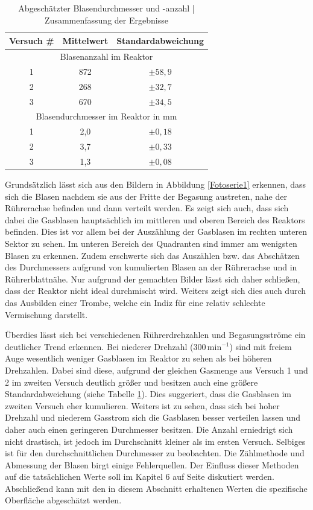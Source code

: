 \documentclass[12pt,liststotoc]{report}
\begin{document}
\begin{table}[H]
	\centering
	\caption{Abgeschätzter Blasendurchmesser und -anzahl | Zusammenfassung der Ergebnisse}
	\begin{tabular}{ccc}
		\toprule
		Versuch \# & Mittelwert & Standardabweichung \\
		\midrule
		\multicolumn{3}{c}{Blasenanzahl im Reaktor}\\
		\midrule
		1&872&$\pm 58,9$\\
		2&268&$\pm 32,7$\\
		3&670&$\pm 34,5$\\
		\midrule
		\multicolumn{3}{c}{Blasendurchmesser im Reaktor in mm}\\
		\midrule
		1&2,0&$\pm 0,18$\\
		2&3,7&$\pm 0,33$\\
		3&1,3&$\pm 0,08$\\	 
		\bottomrule
	\end{tabular}
	\label{tab:Blasendurchmesser_Anzahl_Zusammenfassung}
\end{table}

Grundsätzlich lässt sich aus den Bildern in Abbildung \ref{Fotoserie1} erkennen, dass sich die Blasen nachdem sie aus der Fritte der Begasung austreten, nahe der Rührerachse befinden und dann verteilt werden. Es zeigt sich auch, dass sich dabei die Gasblasen hauptsächlich im mittleren und oberen Bereich des Reaktors befinden. Dies ist vor allem bei der Auszählung der Gasblasen im rechten unteren Sektor zu sehen. Im unteren Bereich des Quadranten sind immer am wenigsten Blasen zu erkennen. Zudem erschwerte sich das Auszählen bzw. das Abschätzen des Durchmessers aufgrund von kumulierten Blasen an der Rührerachse und in Rührerblattnähe. Nur aufgrund der gemachten Bilder lässt sich daher schließen, dass der Reaktor nicht ideal durchmischt wird. Weiters zeigt sich dies auch durch das Ausbilden einer Trombe, welche ein Indiz für eine relativ schlechte Vermischung darstellt.\newline

Überdies lässt sich bei verschiedenen Rührerdrehzahlen und Begasungsströme ein deutlicher Trend erkennen. Bei niederer Drehzahl ($300\,\text{min}^{-1}$) sind mit freiem Auge wesentlich weniger Gasblasen im Reaktor zu sehen als bei höheren Drehzahlen. Dabei sind diese, aufgrund der gleichen Gasmenge aus Versuch 1 und 2 im zweiten Versuch deutlich größer und besitzen auch eine größere Standardabweichung (siehe Tabelle \ref{tab:Blasendurchmesser_Anzahl_Zusammenfassung}). Dies suggeriert, dass die Gasblasen im zweiten Versuch eher kumulieren. Weiters ist zu sehen, dass sich bei hoher Drehzahl und niederem Gasstrom sich die Gasblasen besser verteilen lassen und daher auch einen geringeren Durchmesser besitzen. Die Anzahl erniedrigt sich nicht drastisch, ist jedoch im Durchschnitt kleiner als im ersten Versuch. Selbiges ist für den durchschnittlichen Durchmesser zu beobachten. Die Zählmethode und Abmessung der Blasen birgt einige Fehlerquellen. Der Einfluss dieser Methoden auf die tatsächlichen Werte soll im Kapitel 6 auf Seite \pageref{Interpretation} diskutiert werden. Abschließend kann mit den in diesem Abschnitt erhaltenen Werten die spezifische Oberfläche abgeschätzt werden. 
\end{document}
